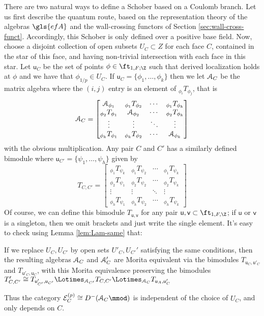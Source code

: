 There are two natural ways to define a Schober based on a Coulomb branch.  Let us first describe the quantum route, based on the representation theory of the algebras $\gls{efA}$ and the wall-crossing functors of Section \ref{sec:wall-cross-funct}. Accordingly, this Schober is only defined over a positive base field.  Now, choose a disjoint collection of open subsets $U_C\subset Z$ for each face $C$, contained in the star of this face, and having non-trivial intersection with each face in this star.  Let $\mathsf{u}_C$ be the set of points $\phi\in \ft_{1,F;\Z}$ such that derived localization holds at $\phi$ and we have that  $\phi_{1/p}\in U_C$.   If $\mathsf{u}_{C}=\{\phi_1,\dots, \phi_k\}$ then we let  $\EuScript{A}_{C}$ be the matrix algebra where the $(i,j)$ entry is an element of ${}_{\phi_i}T_{\phi_j}$, that is  \[
  \EuScript{A}_{C}=\begin{bmatrix}
    \EuScript{A}_{\phi_1} & {}_{\phi_1}T_{\phi_2}& \cdots & {}_{\phi_1}T_{\phi_k}\\    
     {}_{\phi_2}T_{\phi_1}&\EuScript{A}_{\phi_2} & \cdots & {}_{\phi_2}T_{\phi_k}\\
     \vdots & \vdots &\ddots & \vdots\\
      {}_{\phi_k}T_{\phi_1} & {}_{\phi_k}T_{\phi_2} & \cdots &\EuScript{A}_{\phi_k}
   \end{bmatrix}
 \]
 with the obvious multiplication.  Any pair $C$ and $C'$ has a similarly defined bimodule where $\mathsf{u}_{C'}=\{\psi_1,\dots, \psi_h\}$ given by
  \[
  T_{C,C'}=\begin{bmatrix}
    {}_{\phi_1}T_{\psi_k} & {}_{\phi_1}T_{\psi_2}& \cdots & {}_{\phi_1}T_{\psi_k}\\    
     {}_{\phi_2}T_{\psi_1}& {}_{\phi_2}T_{\psi_2} & \cdots & {}_{\phi_2}T_{\psi_k}\\
     \vdots & \vdots &\ddots & \vdots\\
      {}_{\phi_h}T_{\psi_1} & {}_{\phi_h}T_{\psi_2} & \cdots & {}_{\phi_h}T_{\psi_k}
   \end{bmatrix}
 \]
 Of course, we can define this bimodule $T_{\mathsf{u},\mathsf{v}}$ for any pair $\mathsf{u},\mathsf{v}\subset \ft_{1,F,\Z}$; if $\mathsf{u}$ or $\mathsf{v}$ is a singleton, then we omit brackets and just write the single element.   It's easy to check using Lemma \ref{lem:Lam-same} that:
 \begin{lemma}
   If we replace $U_C, U_{C'}$ by open sets $U'_C, U_{C'}'$ satisfying the same conditions, then the resulting algebras $\EuScript{A}_{C}$ and $\EuScript{A}_{C}'$ are Morita equivalent via the bimodules $ T_{\mathsf{u}_C,\mathsf{u}'_C}$ and $ T_{\mathsf{u}'_C,\mathsf{u}_C}$, with this Morita equivalence preserving the bimodules $ T_{C,{C'}}'\cong  T_{\mathsf{u}'_{C'},\mathsf{u}_{C'}}\Lotimes_{\EuScript{A}_{{C'}}}  T_{C,{C'}}\Lotimes_{\EuScript{A}_{C}}T_{\mathsf{u}_A,\mathsf{u}'_C}$
 \end{lemma}
 Thus the category $\mathcal{E}_C^{(p)}\cong D^-(\EuScript{A}_{C}\mmod)$ is independent of the choice of $U_C$, and only depends on $C$.

